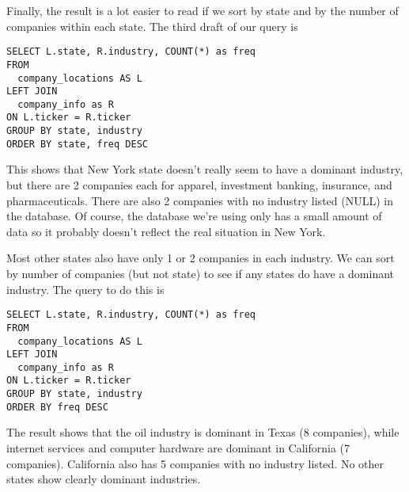 \documentclass[10pt]{exam}
\begin{document}
\begin{questions}
\begin{solution}
Finally, the result is a lot easier to read if we sort by state and by the
number of companies within each state. The third draft of our query is
\begin{lstlisting}
SELECT L.state, R.industry, COUNT(*) as freq
FROM
  company_locations AS L
LEFT JOIN
  company_info as R
ON L.ticker = R.ticker
GROUP BY state, industry
ORDER BY state, freq DESC
\end{lstlisting}

This shows that New York state doesn't really seem to have a dominant industry,
but there are 2 companies each for apparel, investment banking, insurance,
and pharmaceuticals. There are also 2 companies with no industry listed (NULL)
in the database. Of course, the database we're using only has a small amount of
data so it probably doesn't reflect the real situation in New York.

Most other states also have only 1 or 2 companies in each industry. We can sort
by number of companies (but not state) to see if any states do have a dominant
industry. The query to do this is
\begin{lstlisting}
SELECT L.state, R.industry, COUNT(*) as freq
FROM
  company_locations AS L
LEFT JOIN
  company_info as R
ON L.ticker = R.ticker
GROUP BY state, industry
ORDER BY freq DESC
\end{lstlisting}
The result shows that the oil industry is dominant in Texas (8 companies),
while internet services and computer hardware are dominant in California (7
companies). California also has 5 companies with no industry listed. No other
states show clearly dominant industries.
\end{solution}


\end{questions}
\end{document}
